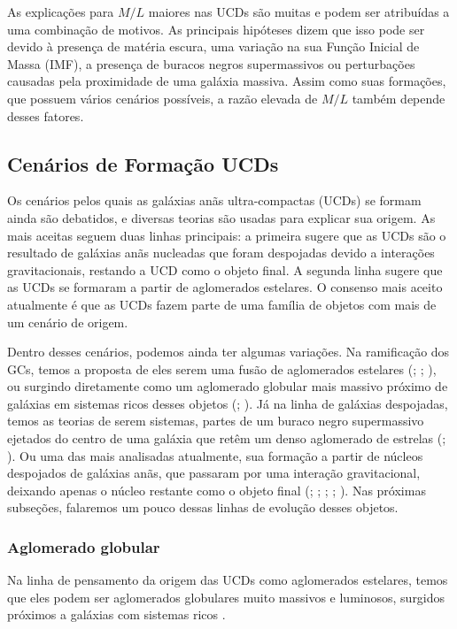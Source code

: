 As explicações para $M/L$ maiores nas UCDs são muitas e podem ser atribuídas a uma combinação de motivos. As principais hipóteses dizem que isso pode ser devido à presença de matéria escura, uma variação na sua Função Inicial de Massa (IMF), a presença de buracos negros supermassivos ou perturbações causadas pela proximidade de uma galáxia massiva. Assim como suas formações, que possuem vários cenários possíveis, a razão elevada de $M/L$ também depende desses fatores.

\subsection{Cenários de Formação UCDs}\label{subsec:formacao}

Os cenários pelos quais as galáxias anãs ultra-compactas (UCDs) se formam ainda são debatidos, e diversas teorias são usadas para explicar sua origem. As mais aceitas seguem duas linhas principais: a primeira sugere que as UCDs são o resultado de galáxias anãs nucleadas que foram despojadas devido a interações gravitacionais, restando a UCD como o objeto final. A segunda linha sugere que as UCDs se formaram a partir de aglomerados estelares. O consenso mais aceito atualmente é que as UCDs fazem parte de uma família de objetos com mais de um cenário de origem.

Dentro desses cenários, podemos ainda ter algumas variações. Na ramificação dos GCs, temos a proposta de eles serem uma fusão de aglomerados estelares (\citealp{Kroupa_1998}; \citealp{Fellhauer_2002}; \citealp{Br_ns_2012}), ou surgindo diretamente como um aglomerado globular mais massivo próximo de galáxias em sistemas ricos desses objetos (\citealp{Mieske_2002}; \citealp{Mieske_2011}). Já na linha de galáxias despojadas, temos as teorias de serem sistemas, partes de um buraco negro supermassivo ejetados do centro de uma galáxia que retêm um denso aglomerado de estrelas (\citealp{Merritt_2009}; \citealp{Leigh_2013}). Ou uma das mais analisadas atualmente, sua formação a partir de núcleos despojados de galáxias anãs, que passaram por uma interação gravitacional, deixando apenas o núcleo restante como o objeto final (\citealp{Bassino_1994}; \citealp{Bekki_2001}; \citealp{Drinkwater_2003}; \citealp{Goerdt_2008}; \citealp{Pfeffer_2013}). Nas próximas subseções, falaremos um pouco dessas linhas de evolução desses objetos.

\subsubsection{Aglomerado globular}\label{subsubsec:}
Na linha de pensamento da origem das UCDs como aglomerados estelares, temos que eles podem ser aglomerados globulares muito massivos e luminosos, surgidos próximos a galáxias com sistemas ricos \citep{Mieske_2002}.

